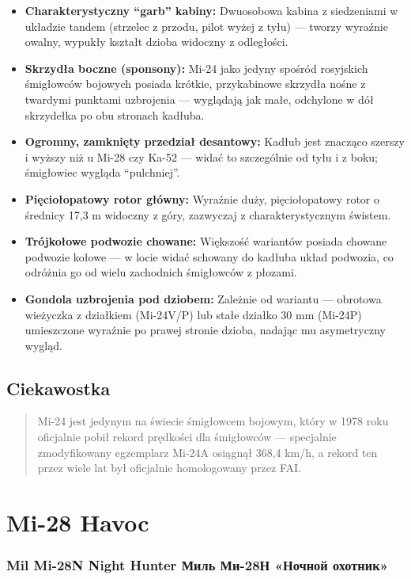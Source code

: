 \documentclass[12pt,oneside]{book}
\providecommand{\tightlist}{%
  \setlength{\itemsep}{0pt}\setlength{\parskip}{0pt}}
\begin{document}
\begin{itemize}
\tightlist
\item
  \textbf{Charakterystyczny ``garb'' kabiny:} Dwuosobowa kabina z
  siedzeniami w układzie tandem (strzelec z przodu, pilot wyżej z tyłu)
  --- tworzy wyraźnie owalny, wypukły kształt dzioba widoczny z
  odległości.
\item
  \textbf{Skrzydła boczne (sponsony):} Mi-24 jako jedyny spośród
  rosyjskich śmigłowców bojowych posiada krótkie, przykabinowe skrzydła
  nośne z twardymi punktami uzbrojenia --- wyglądają jak małe, odchylone
  w dół skrzydełka po obu stronach kadłuba.
\item
  \textbf{Ogromny, zamknięty przedział desantowy:} Kadłub jest znacząco
  szerszy i wyższy niż u Mi-28 czy Ka-52 --- widać to szczególnie od
  tyłu i z boku; śmigłowiec wygląda ``pulchniej''.
\item
  \textbf{Pięciołopatowy rotor główny:} Wyraźnie duży, pięciołopatowy
  rotor o średnicy 17,3 m widoczny z góry, zazwyczaj z
  charakterystycznym świstem.
\item
  \textbf{Trójkołowe podwozie chowane:} Większość wariantów posiada
  chowane podwozie kołowe --- w locie widać schowany do kadłuba układ
  podwozia, co odróżnia go od wielu zachodnich śmigłowców z płozami.
\item
  \textbf{Gondola uzbrojenia pod dziobem:} Zależnie od wariantu ---
  obrotowa wieżyczka z działkiem (Mi-24V/P) lub stałe działko 30 mm
  (Mi-24P) umieszczone wyraźnie po prawej stronie dzioba, nadając mu
  asymetryczny wygląd.
\end{itemize}

\subsection{Ciekawostka}\label{ciekawostka-54}

\begin{quote}
Mi-24 jest jedynym na świecie śmigłowcem bojowym, który w 1978 roku
oficjalnie pobił rekord prędkości dla śmigłowców --- specjalnie
zmodyfikowany egzemplarz Mi-24A osiągnął 368,4 km/h, a rekord ten przez
wiele lat był oficjalnie homologowany przez FAI.
\end{quote}

\section{Mi-28 Havoc}\label{mi-28-havoc}

\subsubsection{Mil Mi-28N Night Hunter \textbar{} Миль Ми-28Н «Ночной
охотник»}\label{mil-mi-28n-night-hunter-ux43cux438ux43bux44c-ux43cux438-28ux43d-ux43dux43eux447ux43dux43eux439-ux43eux445ux43eux442ux43dux438ux43a}
\end{document}

